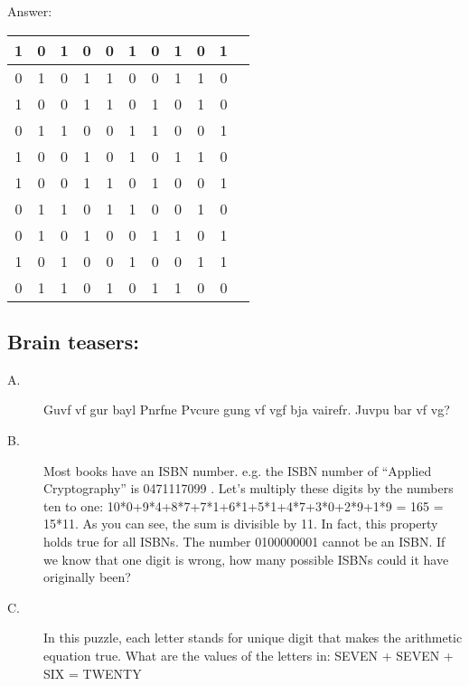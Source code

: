 \documentclass{article}
\begin{document}
Answer:
\begin{table}[ht]
\centering
\begin{tabular}{|c|c|c|c|c|c|c|c|c|c|c|}
\hline 1 & 0 & 1 & 0 & 0 & 1 & 0 & 1 & 0 & 1 \\ 
\hline 0 & 1 & 0 & 1 & 1 & 0 & 0 & 1 & 1 & 0 \\ 
\hline 1 & 0 & 0 & 1 & 1 & 0 & 1 & 0 & 1 & 0 \\ 
\hline 0 & 1 & 1 & 0 & 0 & 1 & 1 & 0 & 0 & 1 \\ 
\hline 1 & 0 & 0 & 1 & 0 & 1 & 0 & 1 & 1 & 0 \\ 
\hline 1 & 0 & 0 & 1 & 1 & 0 & 1 & 0 & 0 & 1 \\ 
\hline 0 & 1 & 1 & 0 & 1 & 1 & 0 & 0 & 1 & 0 \\ 
\hline 0 & 1 & 0 & 1 & 0 & 0 & 1 & 1 & 0 & 1 \\ 
\hline 1 & 0 & 1 & 0 & 0 & 1 & 0 & 0 & 1 & 1 \\ 
\hline 0 & 1 & 1 & 0 & 1 & 0 & 1 & 1 & 0 & 0 \\
\hline
\end{tabular}
\end{table} 


\subsection*{Brain teasers:}
\begin{description}
\item[A.] Guvf vf gur bayl Pnrfne Pvcure gung vf vgf bja vairefr. Juvpu bar vf vg? 

\item[B.] Most books have an ISBN number. e.g.  the ISBN number of “Applied Cryptography” is 0471117099 .  Let's multiply these digits by the numbers ten to one:  10*0+9*4+8*7+7*1+6*1+5*1+4*7+3*0+2*9+1*9 = 165 = 15*11.  As you can see, the sum is divisible by 11. In fact, this property holds true for all ISBNs.  
The number  0100000001 cannot be an ISBN. If we know that one digit is wrong, how many possible ISBNs could it have originally been? 

\item[C.] In this puzzle, each letter stands for unique digit that makes the arithmetic equation true. What are the values of the letters in: SEVEN + SEVEN + SIX = TWENTY


\end{description}
\end{document}
